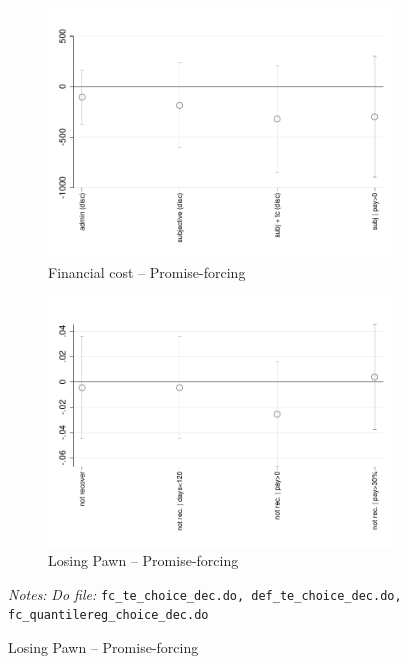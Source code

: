 \documentclass[11pt]{article}
\begin{document}
\begin{figure}[H]
\begin{center}
    \bigskip
    \bigskip
    
    \begin{subfigure}{0.45\textwidth}
        \caption{Financial cost -- Promise-forcing}
        \centering
        \includegraphics[width=\textwidth]{Figuras/fc_te_pro_3.pdf}
    \end{subfigure}
    \begin{subfigure}{0.45\textwidth}
        \caption{Losing Pawn -- Promise-forcing}
        \centering
        \includegraphics[width=\textwidth]{Figuras/def_te_pro_3.pdf}
    \end{subfigure}
    \end{center}
             \footnotesize \textit{Notes: } 
      \footnotesize{ } \textit{Do file: }  \texttt{fc\_te\_choice\_dec.do, def\_te\_choice\_dec.do, fc\_quantilereg\_choice\_dec.do}
\end{figure}
\end{document}

